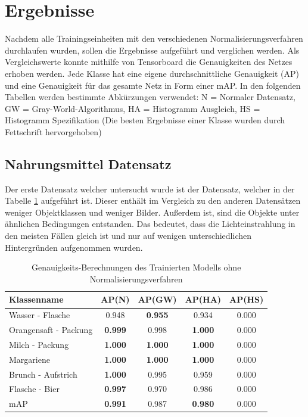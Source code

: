 \documentclass[a4paper,12pt,oneside]{article}
\begin{document}
  \section{Ergebnisse}
Nachdem alle Trainingseinheiten mit den verschiedenen Normalisierungsverfahren durchlaufen wurden, sollen die Ergebnisse aufgeführt und verglichen werden. Als Vergleichswerte konnte mithilfe von Tensorboard die Genauigkeiten des Netzes erhoben werden. Jede Klasse hat eine eigene durchschnittliche Genauigkeit (AP) und eine Genauigkeit für das gesamte Netz in Form einer mAP. In den folgenden Tabellen werden bestimmte Abkürzungen verwendet: N = Normaler Datensatz, GW = Gray-World-Algorithmus, HA = Histogramm Ausgleich, HS = Histogramm Spezifikation (Die besten Ergebnisse einer Klasse wurden durch Fettschrift hervorgehoben) 
  \subsection{Nahrungsmittel Datensatz}
Der erste Datensatz welcher untersucht wurde ist der Datensatz, welcher in der Tabelle \ref{tab:nahrungsmitteltest} aufgeführt ist. Dieser enthält im Vergleich zu den anderen Datensätzen weniger Objektklassen und weniger Bilder. Außerdem ist, sind die Objekte unter ähnlichen Bedingungen entstanden. Das bedeutet, dass die Lichteinstrahlung in den meisten Fällen gleich ist und nur auf wenigen unterschiedlichen Hintergründen aufgenommen wurden.
\begin{table}
[h]
\caption{Genauigkeits-Berechnungen des Trainierten Modells ohne Normalisierungsverfahren}
\centering
\begin{tabular}{|l|c|c|c|c|}
\hline
Klassenname & AP(N) & AP(GW) & AP(HA) & AP(HS)\\
\hline
Wasser - Flasche & 0.948 & \textbf{0.955} & 0.934 & 0.000\\
Orangensaft - Packung & \textbf{0.999} & 0.998 & \textbf{1.000} & 0.000\\
Milch - Packung & \textbf{1.000} & \textbf{1.000} & \textbf{1.000} & 0.000\\
Margariene & \textbf{1.000} & \textbf{1.000} & \textbf{1.000} & 0.000\\
Brunch - Aufstrich & \textbf{1.000} & 0.995 & 0.959 & 0.000\\
Flasche - Bier & \textbf{0.997} & 0.970 & 0.986 & 0.000\\
\hline
mAP & \textbf{0.991} & 0.987 & \textbf{0.980} & 0.000\\
\hline
\end{tabular}
\label{tab:nahrungsmitteltest}
\end{table}
\end{document}
